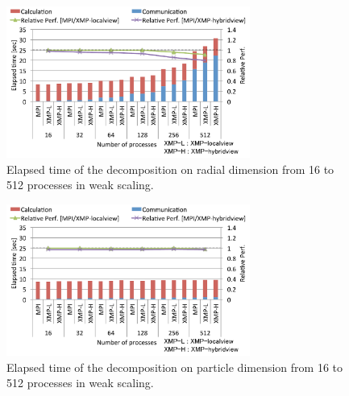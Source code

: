 \begin{figure}[t]
\begin{center}
\includegraphics[width=8cm, bb=0 0 492 306]{./figure/radial_w.pdf}
\caption{Elapsed time of the decomposition on radial dimension from 16 to 512 processes in weak scaling.}
\label{radial_w}
\end{center}
\end{figure}


\begin{figure}[t]
\begin{center}
\includegraphics[width=8cm, bb=0 0 492 306]{./figure/particle_w.pdf}
\caption{Elapsed time of the decomposition on particle dimension from 16 to 512 processes in weak scaling.}
\label{particle_w}
\end{center}
\end{figure}



